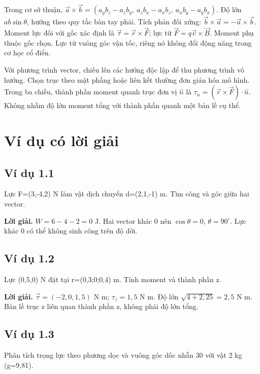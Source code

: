 \documentclass[11pt,a4paper,openany]{book}
\begin{document}
Trong cơ sở thuận, $\vec a\times\vec b=(a_yb_z-a_zb_y,\ a_zb_x-a_xb_z,\ a_xb_y-a_yb_x)$. Độ lớn $ab\sin\theta$, hướng theo quy tắc bàn tay phải. Tích phản đối xứng: $\vec b\times\vec a=-\vec a\times\vec b$. Moment lực đối với gốc xác định là $\vec\tau=\vec r\times\vec F$; lực từ $\vec F=q\vec v\times\vec B$. Moment phụ thuộc gốc chọn. Lực từ vuông góc vận tốc, riêng nó không đổi động năng trong cơ học cổ điển.

Với phương trình vector, chiếu lên các hướng độc lập để thu phương trình vô hướng. Chọn trục theo mặt phẳng hoặc liên kết thường đơn giản hóa mô hình. Trong ba chiều, thành phần moment quanh trục đơn vị $\hat n$ là $\tau_n=(\vec r\times\vec F)\cdot\hat n$. Không nhầm độ lớn moment tổng với thành phần quanh một bản lề cụ thể.
\begin{center}
\end{center}
\section{Ví dụ có lời giải}
\subsection*{Ví dụ 1.1}
Lực F=(3,-4,2) N làm vật dịch chuyển d=(2,1,-1) m. Tìm công và góc giữa hai vector.

\textbf{Lời giải.} $W=6-4-2=0$ J. Hai vector khác 0 nên $\cos\theta=0$, $\theta=90^\circ$. Lực khác 0 có thể không sinh công trên độ dời.
\subsection*{Ví dụ 1.2}
Lực (0,5,0) N đặt tại r=(0,3;0;0,4) m. Tính moment và thành phần z.

\textbf{Lời giải.} $\vec\tau=(-2,0,1{,}5)$ N m; $\tau_z=1{,}5$ N m. Độ lớn $\sqrt{4+2{,}25}=2{,}5$ N m. Bản lề trục z liên quan thành phần z, không phải độ lớn tổng.
\subsection*{Ví dụ 1.3}
Phân tích trọng lực theo phương dọc và vuông góc dốc nhẵn 30\textdegree{} với vật 2 kg (g=9,81).
\end{document}
